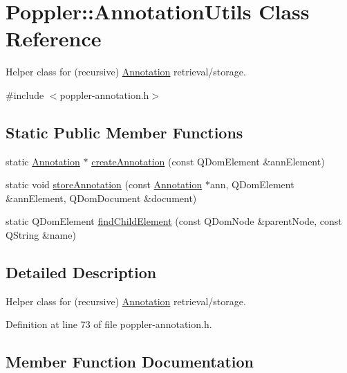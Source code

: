 \hypertarget{class_poppler_1_1_annotation_utils}{}\section{Poppler\+:\+:Annotation\+Utils Class Reference}
\label{class_poppler_1_1_annotation_utils}


Helper class for (recursive) \hyperlink{class_poppler_1_1_annotation}{Annotation} retrieval/storage.  




{\ttfamily \#include $<$poppler-\/annotation.\+h$>$}

\subsection*{Static Public Member Functions}
\begin{DoxyCompactItemize}
\item 
static \hyperlink{class_poppler_1_1_annotation}{Annotation} $\ast$ \hyperlink{class_poppler_1_1_annotation_utils_a877dcd5f1e9f136ff86ae96de85712e0}{create\+Annotation} (const Q\+Dom\+Element \&ann\+Element)
\item 
static void \hyperlink{class_poppler_1_1_annotation_utils_a1ef4c62890bcf810bba8d8a08763d784}{store\+Annotation} (const \hyperlink{class_poppler_1_1_annotation}{Annotation} $\ast$ann, Q\+Dom\+Element \&ann\+Element, Q\+Dom\+Document \&document)
\item 
static Q\+Dom\+Element \hyperlink{class_poppler_1_1_annotation_utils_add8a7dc39bd8225aa8d7ff7d53be70b8}{find\+Child\+Element} (const Q\+Dom\+Node \&parent\+Node, const Q\+String \&name)
\end{DoxyCompactItemize}


\subsection{Detailed Description}
Helper class for (recursive) \hyperlink{class_poppler_1_1_annotation}{Annotation} retrieval/storage. 

Definition at line 73 of file poppler-\/annotation.\+h.



\subsection{Member Function Documentation}
\mbox{\label{class_poppler_1_1_annotation_utils_a877dcd5f1e9f136ff86ae96de85712e0}} 
